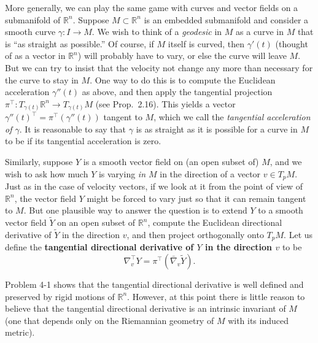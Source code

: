 More generally, we can play the same game with curves and vector fields on a submanifold of $\mathbb{R}^n$. Suppose $M \subset \mathbb{R}^n$ is an embedded submanifold and consider a smooth curve $\gamma : I \to M$. We wish to think of a \emph{geodesic} in $M$ as a curve in $M$ that is ``as straight as possible.'' Of course, if $M$ itself is curved, then $\gamma'(t)$ (thought of as a vector in $\mathbb{R}^n$) will probably have to vary, or else the curve will leave $M$. But we can try to insist that the velocity not change any more than necessary for the curve to stay in $M$. One way to do this is to compute the Euclidean acceleration $\gamma''(t)$ as above, and then apply the tangential projection $\pi^\top : T_{\gamma(t)}\mathbb{R}^n \to T_{\gamma(t)}M$ (see Prop.\ 2.16).
This yields a vector $\gamma''(t)^\top = \pi^\top(\gamma''(t))$ tangent to $M$, which we call the \emph{tangential acceleration of $\gamma$}. It is reasonable to say that $\gamma$ is as straight as it is possible for a curve in $M$ to be if its tangential acceleration is zero.

Similarly, suppose $Y$ is a smooth vector field on (an open subset of) $M$, and we wish to ask how much $Y$ is varying \emph{in $M$} in the direction of a vector $v \in T_pM$. Just as in the case of velocity vectors, if we look at it from the point of view of $\mathbb{R}^n$, the vector field $Y$ might be forced to vary just so that it can remain tangent to $M$. But one plausible way to answer the question is to extend $Y$ to a smooth vector field $\tilde{Y}$ on an open subset of $\mathbb{R}^n$, compute the Euclidean directional derivative of $\tilde{Y}$ in the direction $v$, and then project orthogonally onto $T_pM$. Let us define the \textbf{tangential directional derivative of $Y$ in the direction $v$} to be
\begin{equation}
\nabla_v^\top Y = \pi^\top(\bar{\nabla}_v \tilde{Y}). \tag{4.4}
\end{equation}


Problem 4-1 shows that the tangential directional derivative is well defined and preserved by rigid motions of $\mathbb{R}^n$. However, at this point there is little reason to believe that the tangential directional derivative is an intrinsic invariant of $M$ (one that depends only on the Riemannian geometry of $M$ with its induced metric).

